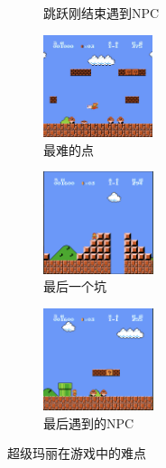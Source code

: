 \begin{figure}[!htp]
\begin{subfigure}{3cm}
      \caption{跳跃刚结束遇到NPC}
  \end{subfigure}
  \hspace{1em}
  \begin{subfigure}{3cm}
    \centering
    \includegraphics[height=3cm]{static/j.png}
    \caption{最难的点}
  \end{subfigure}
  \hspace{1em}
  \begin{subfigure}{3cm}
    \centering
    \includegraphics[height=3cm]{static/l.png}
    \caption{最后一个坑}
  \end{subfigure}
  \hspace{1em}
  \begin{subfigure}{3cm}
    \centering
    \includegraphics[height=3cm]{static/m.png}
    \caption{最后遇到的NPC}
  \end{subfigure}
  \label{fig:mario}
  \caption{超级玛丽在游戏中的难点}
\end{figure}
\cleardoublepage

